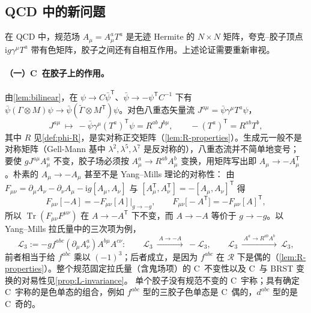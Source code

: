 \documentclass[UTF8,a4paper,11pt,fontset=fandol]{ctexart}
\theoremstyle{cplain}
\theoremstyle{cdefinition}
\theoremstyle{cremark}
\numberwithin{equation}{section}
\DeclareMathOperator{\Tr}{Tr}
\newcommand{\tp}{\mathsf{T}}                         %
\newcommand{\Rop}{\mathcal{R}}                       %
\newcommand{\ii}{\mathrm{i}}                        %
\newcommand{\Cconj}[1]{\widetilde{#1}}              %
\begin{document}
\subsection{QCD 中的新问题}\label{sec:intro-qcd}

在 QCD 中，规范场 $A_\mu=A^a_\mu T^a$ 是无迹 Hermite 的 $N\times N$ 矩阵，夸克--胶子顶点 $\ii g\gamma^\mu T^a$ 带有色矩阵，胶子之间还有自相互作用。上述论证需要重新审视。

\paragraph{（一）C~在胶子上的作用。}
由\cref{lem:bilinear}，在 $\psi\to C\bar\psi^{\tp}$、$\bar\psi\to-\psi^{\tp}C^{-1}$ 下有 $\bar\psi(\Gamma\otimes M)\psi\to\bar\psi(\Cconj\Gamma\otimes M^{\tp})\psi$。对色八重态矢量流 $J^{a\mu}=\bar\psi\gamma^\mu T^a\psi$，
\begin{equation}\label{eq:intro-octet}
J^{a\mu}\ \longmapsto\ -\bar\psi\gamma^\mu(T^a)^{\tp}\psi=R^{ab}J^{b\mu},\qquad -(T^a)^{\tp}=R^{ab}T^b ,
\end{equation}
其中 $R$ 见\cref{def:phi-R}，是实对称正交矩阵（\cref{lem:R-properties}）。生成元一般不是对称矩阵（Gell-Mann 基中 $\lambda^2,\lambda^5,\lambda^7$ 是反对称的），八重态流并不简单地变号；
要使 $gJ^{a\mu}A^a_\mu$ 不变，胶子场必须按 $A^a_\mu\to R^{ab}A^b_\mu$ 变换，用矩阵写出即 $A_\mu\to-A_\mu^{\tp}$。朴素的 $A_\mu\to-A_\mu$ 甚至不是 Yang--Mills 理论的对称性：
由 $F_{\mu\nu}=\partial_\mu A_\nu-\partial_\nu A_\mu-\ii g[A_\mu,A_\nu]$ 与 $[A_\mu^{\tp},A_\nu^{\tp}]=-[A_\mu,A_\nu]^{\tp}$ 得
\begin{equation}\label{eq:intro-F}
F_{\mu\nu}[-A]=-F_{\mu\nu}[A]\big|_{g\to-g},\qquad
F_{\mu\nu}\bigl[-A^{\tp}\bigr]=-F_{\mu\nu}[A]^{\tp},
\end{equation}
所以 $\Tr(F_{\mu\nu}F^{\mu\nu})$ 在 $A\to-A^{\tp}$ 下不变，而 $A\to-A$ 等价于 $g\to-g$。以 Yang--Mills 拉氏量中的三次项为例，
\begin{equation*}
\mathcal L_3:=-gf^{abc}(\partial_\mu A^a_\nu)A^{b\mu}A^{c\nu}:\qquad
\mathcal L_3\ \xrightarrow{\;A\to-A\;}\ -\mathcal L_3,\qquad
\mathcal L_3\ \xrightarrow{\;A^a\to R^{ab}A^b\;}\ \mathcal L_3 ,
\end{equation*}
前者相当于给 $f^{abc}$ 乘以 $(-1)^3$；后者成立，是因为 $f^{abc}$ 在 $\Rop$ 下是偶的（\cref{lem:R-properties}）。整个规范固定拉氏量（含鬼场项）的 C~不变性以及 C~与 BRST 变换的对易性见\cref{prop:L-invariance}。
单个胶子没有规范不变的 C~宇称；具有确定 C~宇称的是色单态的组合，例如 $f^{abc}$ 型的三胶子色单态是 C~偶的，$d^{abc}$ 型的是 C~奇的\cite{Ewerz2003}。
\end{document}
